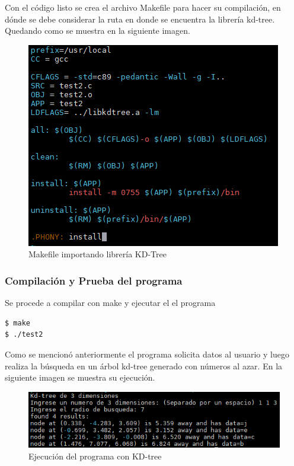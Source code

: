\documentclass[12pt]{article}
\begin{document}
Con el código listo se crea el archivo Makefile para hacer su compilación, en dónde se debe considerar la ruta en donde se encuentra la librería kd-tree. Quedando como se muestra en la siguiente imagen.

\begin{figure}[!h]
   \centering
   \includegraphics[scale=.72]{imgs/makefile_kdtree.png}
   \caption{Makefile importando librería KD-Tree}
   \label{fig1}
\end{figure}

\subsubsection{Compilación y Prueba del programa}

Se procede a compilar con make y ejecutar el el programa

\begin{lstlisting}[frame=single]
$ make
$ ./test2
\end{lstlisting}

Como se mencionó anteriormente el programa solicita datos al usuario y luego realiza la búsqueda en un árbol kd-tree generado con números al azar. En la siguiente imagen se muestra su ejecución.

\begin{figure}[!h]
   \centering
   \includegraphics[scale=.72]{imgs/kdtree.png}
   \caption{Ejecución del programa con KD-tree}
   \label{fig2}
\end{figure}
\newpage
\end{document}
